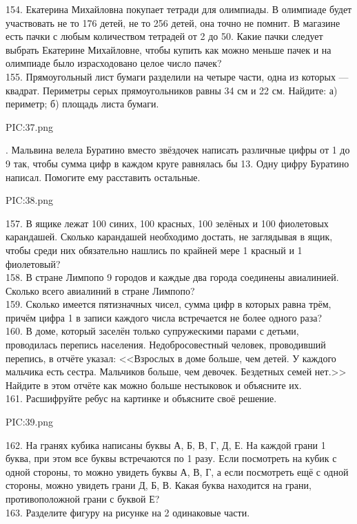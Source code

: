154. Екатерина Михайловна покупает тетради для олимпиады. В олимпиаде будет участвовать не то 176 детей, не то 256 детей, она точно не помнит. В магазине есть пачки с любым количеством тетрадей от 2 до 50. Какие пачки следует выбрать Екатерине Михайловне, чтобы купить как можно меньше пачек и на олимпиаде было израсходовано целое число пачек?\\
155. Прямоугольный лист бумаги разделили на четыре части, одна из которых --- квадрат. Периметры серых прямоугольников равны 34 см и 22 см. Найдите: а) периметр; б) площадь листа бумаги.
\begin{center}
{{PIC:37.png}}
\end{center}\newpage{}. Мальвина велела Буратино вместо звёздочек написать различные цифры от 1 до 9 так, чтобы сумма цифр в каждом круге равнялась бы 13. Одну цифру Буратино написал. Помогите ему расставить остальные.
\begin{center}
{{PIC:38.png}}
\end{center}
157. В ящике лежат 100 синих, 100 красных, 100 зелёных и 100 фиолетовых карандашей. Сколько карандашей необходимо достать, не заглядывая в ящик, чтобы среди них обязательно нашлись по крайней мере 1 красный и 1 фиолетовый?\\
158. В стране Лимпопо 9 городов и каждые два города соединены авиалинией. Сколько всего авиалиний в стране Лимпопо?\\
159. Сколько имеется пятизначных чисел, сумма цифр в которых равна трём, причём цифра 1 в записи каждого числа встречается не более одного раза?\\
160. В доме, который заселён только супружескими парами с детьми, проводилась перепись населения. Недобросовестный человек, проводивший перепись, в отчёте указал: <<Взрослых в доме больше, чем детей. У каждого мальчика есть сестра. Мальчиков больше, чем девочек. Бездетных семей нет.>> Найдите в этом отчёте
как можно больше нестыковок и объясните их.\\
161. Расшифруйте ребус на картинке и объясните своё решение.
\begin{center}
{{PIC:39.png}}
\end{center}
162. На гранях кубика написаны буквы А, Б, В, Г, Д, Е. На каждой грани 1 буква, при этом все буквы встречаются по 1 разу. Если посмотреть на кубик с одной стороны, то можно увидеть буквы А, В, Г, а если посмотреть ещё с одной стороны, можно увидеть грани Д, Б, В. Какая буква находится на грани, противоположной грани с буквой Е?\\
163. Разделите фигуру на рисунке на 2 одинаковые части.
